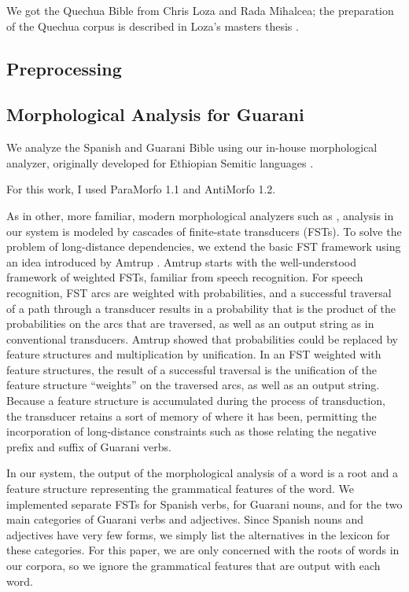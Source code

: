 We got the Quechua Bible from Chris Loza and Rada Mihalcea; the preparation
of the Quechua corpus is described in Loza's masters thesis \cite{chrisloza}.

\subsection{Preprocessing}

\subsection{Morphological Analysis for Guarani}
\label{sec:guaranima}
We analyze the Spanish and Guarani Bible using our in-house morphological
analyzer, originally developed for Ethiopian Semitic languages 
\cite{gasser:eacl09}.

For this work, I used ParaMorfo 1.1 and AntiMorfo 1.2.

As in other, more familiar, modern
morphological analyzers such as \cite{beesley+karttunen}, analysis in our
system is modeled by cascades of finite-state transducers (FSTs).  To solve the
problem of long-distance dependencies, we extend the basic FST framework using
an idea introduced by Amtrup \cite{amtrup:03}.  Amtrup starts with the
well-understood framework of weighted FSTs, familiar from speech recognition.
For speech recognition, FST arcs are weighted with probabilities, and a
successful traversal of a path through a transducer results in a probability
that is the product of the probabilities on the arcs that are traversed, as
well as an output string as in conventional transducers.  Amtrup showed that
probabilities could be replaced by feature structures and multiplication by
unification.  In an FST weighted with feature structures, the result of a
successful traversal is the unification of the feature structure ``weights'' on
the traversed arcs, as well as an output string.  Because a feature structure
is accumulated during the process of transduction, the transducer retains a
sort of memory of where it has been, permitting the incorporation of
long-distance constraints such as those relating the negative prefix and suffix
of Guarani verbs.

In our system, the output of the morphological analysis of a word is a root and
a feature structure representing the grammatical features of the word.  We
implemented separate FSTs for Spanish verbs, for Guarani nouns, and for the two
main categories of Guarani verbs and adjectives.  Since Spanish nouns and
adjectives have very few forms, we simply list the alternatives in the lexicon
for these categories.  For this paper, we are only concerned with the roots of
words in our corpora, so we ignore the grammatical features that are output
with each word.


